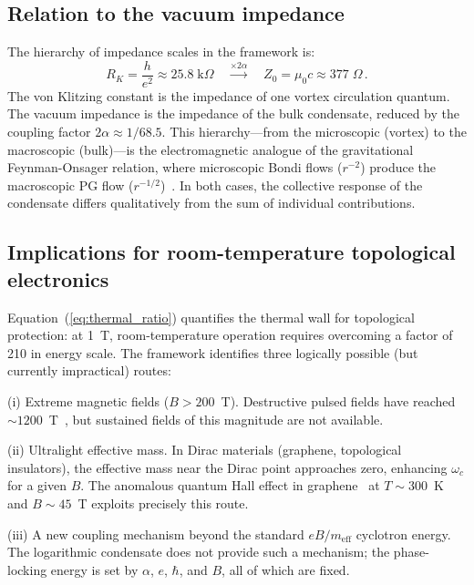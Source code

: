 \documentclass[12pt, a4paper]{article}
\newcommand{\meff}{m_{\mathrm{eff}}}
\begin{document}
\subsection{Relation to the vacuum impedance}

The hierarchy of impedance scales in the framework
is:
\begin{equation}
    R_K = \frac{h}{e^2} \approx 25.8\;\text{k}\Omega
    \quad\xrightarrow{\times 2\alpha}\quad
    Z_0 = \mu_0 c \approx 377\;\Omega\,.
\label{eq:hierarchy}
\end{equation}
The von Klitzing constant is the impedance of one
vortex circulation quantum. The vacuum impedance is
the impedance of the bulk condensate, reduced by the
coupling factor $2\alpha \approx 1/68.5$. This
hierarchy---from the microscopic (vortex) to the
macroscopic (bulk)---is the electromagnetic analogue
of the gravitational Feynman-Onsager relation, where
microscopic Bondi flows ($r^{-2}$) produce the
macroscopic PG flow
($r^{-1/2}$)~\cite{kulangiev_geff}. In both cases,
the collective response of the condensate differs
qualitatively from the sum of individual
contributions.

\subsection{Implications for room-temperature
topological electronics}

Equation~(\ref{eq:thermal_ratio}) quantifies the
thermal wall for topological protection: at 1~T,
room-temperature operation requires overcoming a
factor of 210 in energy scale. The framework
identifies three logically possible (but currently
impractical) routes:

(i) Extreme magnetic fields ($B > 200$~T).
Destructive pulsed fields have reached
$\sim 1200$~T~\cite{nakamura_2018}, but sustained
fields of this magnitude are not available.

(ii) Ultralight effective mass. In Dirac
materials (graphene, topological insulators), the
effective mass near the Dirac point approaches
zero, enhancing $\omega_c$ for a given $B$. The
anomalous quantum Hall effect in
graphene~\cite{novoselov_2005} at $T \sim 300$~K
and $B \sim 45$~T exploits precisely this route.

(iii) A new coupling mechanism beyond the standard
$eB/\meff$ cyclotron energy. The logarithmic
condensate does not provide such a mechanism; the
phase-locking energy is set by $\alpha$, $e$,
$\hbar$, and $B$, all of which are fixed.
\end{document}
